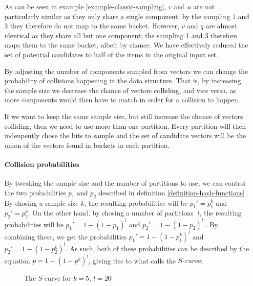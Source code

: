 As can be seen in example \ref{example-classic-sampling}, $v$ and $u$ are not particularly similar as they only share a single component; by the sampling 1 and 3 they therefore do not map to the same bucket. However, $v$ and $q$ are almost identical as they share all but one component; the sampling 1 and 3 therefore maps them to the same bucket, albeit by chance. We have effectively reduced the set of potential candidates to half of the items in the original input set.

By adjusting the number of components sampled from vectors we can change the probability of collisions happening in the data structure. That is, by increasing the sample size we decrease the chance of vectors colliding, and vice versa, as more components would then have to match in order for a collision to happen.

If we want to keep the same sample size, but still increase the chance of vectors colliding, then we need to use more than one partition. Every partition will then indenpently chose the bits to sample and the set of candidate vectors will be the union of the vectors found in buckets in each partition.

\paragraph{Collision probabilities} By tweaking the sample size and the number of partitions to use, we can control the two probabilities $p_1$ and $p_2$ described in definition \ref{definition-hash-functions} \cite[p. 101]{DBLP:books/cu/LeskovecRU14}. By chosing a sample size $k$, the resulting probabilities will be $p_1' = p_1^k$ and  $p_2' = p_2^k$. On the other hand, by chosing a number of partitions 􏰄$l$, the resulting probabilities will be $p_1' = 1 - (1 - p_1)^l$ and $p_2' = 1 - (1 - p_2)^l􏰅$. By combining these, we get the probabilities $p_1' = 1 - (1 - p_1^k)^l$ and $p_2' = 1 - (1 - p_2^k)^l$. As such, both of these probabilities can be described by the equation $p = 1 - (1 - p^k)^l$, giving rise to what \cite[p. 89]{DBLP:books/cu/LeskovecRU14} calls the \textit{$S$-curve}:

\begin{figure}[ht]

  \caption{The $S$-curve for $k = 5$, $l = 20$}
\end{figure}

